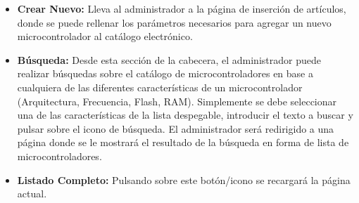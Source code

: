 \begin{itemize}
	
	\item \textbf{Crear Nuevo:} Lleva al administrador a la página de inserción de artículos, donde se puede rellenar los parámetros necesarios para agregar un nuevo microcontrolador al catálogo electrónico.

	\item \textbf{Búsqueda:} Desde esta sección de la cabecera, el administrador puede realizar búsquedas sobre el catálogo de microcontroladores en base a cualquiera de las diferentes características de un microcontrolador (Arquitectura, Frecuencia, Flash, RAM). Simplemente se debe seleccionar una de las características de la lista despegable, introducir el texto a buscar y pulsar sobre el icono de búsqueda.
	El administrador será redirigido a una página donde se le mostrará el resultado de la búsqueda en forma de lista de microcontroladores.
			
	\item \textbf{Listado Completo:} Pulsando sobre este botón/icono se recargará la página actual.
\end{itemize}